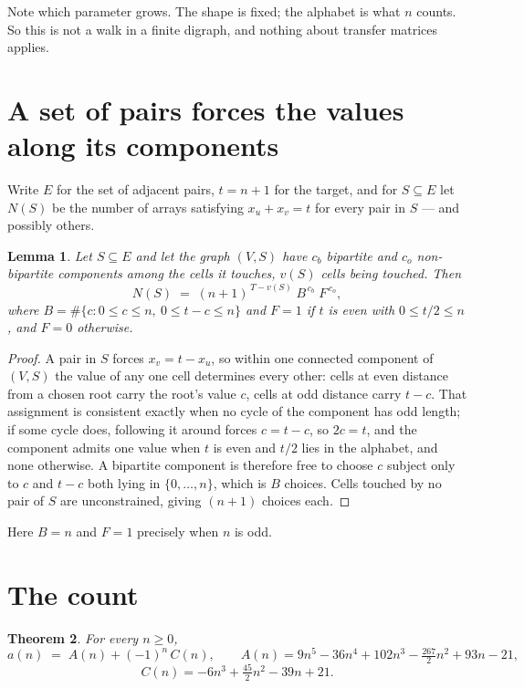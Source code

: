 \documentclass[11pt,a4paper]{article}
\theoremstyle{plain}
\newtheorem{theorem}{Theorem}
\newtheorem{lemma}[theorem]{Lemma}
\theoremstyle{definition}
\begin{document}
Note which parameter grows. The shape is fixed; the alphabet is what $n$ counts. So this is not
a walk in a finite digraph, and nothing about transfer matrices applies.

\section{A set of pairs forces the values along its components}

Write $E$ for the set of adjacent pairs, $t=n+1$ for the target, and for $S\subseteq E$ let
$N(S)$ be the number of arrays satisfying $x_u+x_v=t$ for every pair in $S$ --- and possibly
others.

\begin{lemma}\label{lem:comp}
Let $S\subseteq E$ and let the graph $(V,S)$ have $c_b$ bipartite and $c_o$ non-bipartite
components among the cells it touches, $v(S)$ cells being touched. Then
\[
N(S)\;=\;(n+1)^{\,T-v(S)}\;B^{\,c_b}\;F^{\,c_o},
\]
where $B=\#\{c: 0\le c\le n,\ 0\le t-c\le n\}$ and $F=1$ if $t$ is even with $0\le t/2\le n$,
and $F=0$ otherwise.
\end{lemma}

\begin{proof}
A pair in $S$ forces $x_v=t-x_u$, so within one connected component of $(V,S)$ the value of any
one cell determines every other: cells at even distance from a chosen root carry the root's
value $c$, cells at odd distance carry $t-c$. That assignment is consistent exactly when no
cycle of the component has odd length; if some cycle does, following it around forces $c=t-c$,
so $2c=t$, and the component admits one value when $t$ is even and $t/2$ lies in the alphabet,
and none otherwise. A bipartite component is therefore free to choose $c$ subject only to
$c$ and $t-c$ both lying in $\{0,\dots,n\}$, which is $B$ choices. Cells touched by no pair
of $S$ are unconstrained, giving $(n+1)$ choices each.
\end{proof}

Here $B=n$ and $F=1$ precisely when $n$ is odd.

\section{The count}

\begin{theorem}\label{thm:quasi}
For every $n\ge0$,
\[
a(n)\;=\;A(n)+(-1)^n\,C(n),\qquad
A(n)=9n^{5} - 36n^{4} + 102n^{3} - \tfrac{267}{2}n^{2} + 93n - 21,
\]
\[
C(n)=- 6n^{3} + \tfrac{45}{2}n^{2} - 39n + 21.
\]
\end{theorem}
\end{document}
